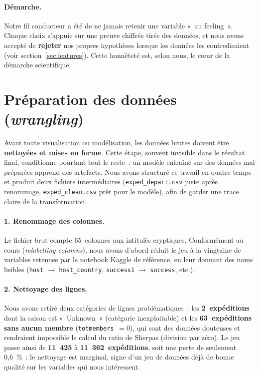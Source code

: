 \documentclass[11pt,a4paper]{article}
\begin{document}
\paragraph{Démarche.} Notre fil conducteur a été de ne jamais retenir une
variable «~au feeling~». Chaque choix s'appuie sur une preuve chiffrée tirée
des données, et nous avons accepté de \textbf{rejeter} nos propres
hypothèses lorsque les données les contredisaient (voir
section~\ref{sec:features}). Cette honnêteté est, selon nous, le c\oe ur de
la démarche scientifique.

\section{Préparation des données (\textit{wrangling})}
\label{sec:wrangling}

Avant toute visualisation ou modélisation, les données brutes doivent être
\textbf{nettoyées et mises en forme}. Cette étape, souvent invisible dans le
résultat final, conditionne pourtant tout le reste~: un modèle entraîné sur des
données mal préparées apprend des artefacts. Nous avons structuré ce travail en
quatre temps et produit deux fichiers intermédiaires (\texttt{exped\_depart.csv}
juste après renommage, \texttt{exped\_clean.csv} prêt pour le modèle), afin de
garder une trace claire de la transformation.

\paragraph{1. Renommage des colonnes.} Le fichier brut compte 65~colonnes aux
intitulés cryptiques. Conformément au cours (\textit{relabelling columns}), nous
avons d'abord réduit le jeu à la vingtaine de variables retenues par le notebook
Kaggle de référence, en leur donnant des noms lisibles (\texttt{host} $\to$
\texttt{host\_country}, \texttt{success1} $\to$ \texttt{success}, etc.).

\paragraph{2. Nettoyage des lignes.} Nous avons retiré deux catégories de lignes
problématiques~: les \textbf{2~expéditions} dont la saison est «~Unknown~»
(catégorie inexploitable) et les \textbf{63~expéditions sans aucun membre}
(\texttt{totmembers}~$=0$), qui sont des données douteuses et rendraient
impossible le calcul du ratio de Sherpas (division par zéro). Le jeu passe ainsi
de \textbf{11~425} à \textbf{11~362~expéditions}, soit une perte de seulement
0{,}6~\%~: le nettoyage est marginal, signe d'un jeu de données déjà de bonne
qualité sur les variables qui nous intéressent.
\end{document}
